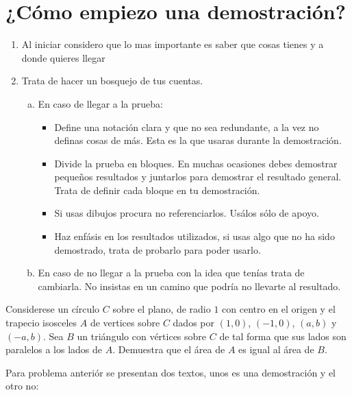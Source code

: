 \chapter*{¿Cómo empiezo una demostración?}

\begin{enumerate}
  \item Al iniciar considero que lo mas importante es
    saber que cosas tienes y a donde quieres llegar
  \item Trata de hacer un bosquejo de tus cuentas.

  \begin{enumerate}[a)]
    \item En caso de llegar a la prueba:\
    \begin{itemize}
      \item Define una notación clara y que no sea redundante,
        a la vez no definas cosas de más.
        Esta es la que usaras durante la demostración.\
      \item Divide la prueba en bloques.
        En muchas ocasiones debes demostrar pequeños resultados
        y juntarlos para demostrar el resultado general.
        Trata de definir cada bloque en tu demostración.
      \item Si usas dibujos procura no referenciarlos.
        Usálos sólo de apoyo.
      \item Haz enfásis en los resultados utilizados, si usas algo que no ha sido demostrado, trata de probarlo para poder usarlo.
      \end{itemize}

      \item En caso de no llegar a la prueba con la idea que tenías trata de cambiarla. No insistas en un camino que podría no llevarte al resultado.
    \end{enumerate}

  \end{enumerate}

  \begin{exmp}
    Considerese un círculo $C$ sobre el plano,
    de radio $1$ con centro en el origen
    y el trapecio isosceles $A$ de vertices sobre $C$
    dados por $(1,0)$, $(-1,0)$, $(a,b)$ y $(-a,b)$.
    Sea $B$ un triángulo con vértices sobre $C$
    de tal forma que sus lados son paralelos a los lados de $A$.
    Demuestra que el área de $A$ es igual al área de $B.$
  \end{exmp}

  \item Para problema anteriór se presentan dos textos, unos es una demostración y el otro no:

